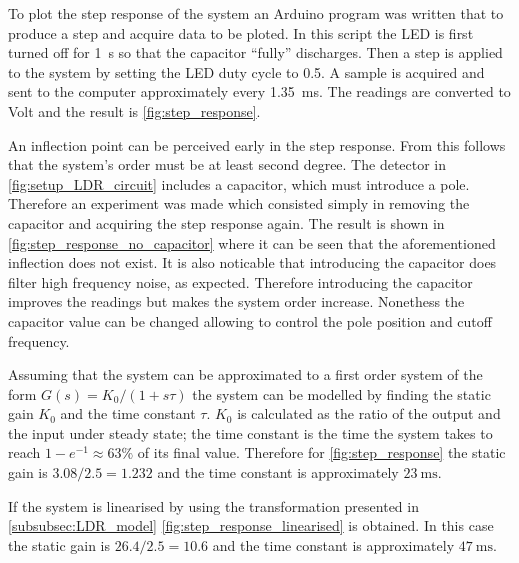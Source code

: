 To plot the step response of the system an Arduino program was written that to produce a step and acquire data to be ploted. In this script the LED is first turned off for \SI{1}{\second} so that the capacitor ``fully'' discharges. Then a step is applied to the system by setting the LED duty cycle to 0.5. A sample is acquired and sent to the computer approximately every \SI{1.35}{\milli\second}. The readings are converted to Volt and the result is \autoref{fig:step_response}.

An inflection point can be perceived early in the step response. From this follows that the system's order must be at least second degree. The detector in \autoref{fig:setup_LDR_circuit} includes a capacitor, which must introduce a pole. Therefore an experiment was made which consisted simply in removing the capacitor and acquiring the step response again. The result is shown in \autoref{fig:step_response_no_capacitor} where it can be seen that the aforementioned inflection does not exist. It is also noticable that introducing the capacitor does filter high frequency noise, as expected. Therefore introducing the capacitor improves the readings but makes the system order increase. Nonethess the capacitor value can be changed allowing to control the pole position and cutoff frequency.

Assuming that the system can be approximated to a first order system of the form $G(s) = K_0/(1+s\tau)$ the system can be modelled by finding the static gain $K_0$ and the time constant $\tau$. $K_0$ is calculated as the ratio of the output and the input under steady state; the time constant is the time the system takes to reach $1-e^{-1} \approx 63 \%$ of its final value. Therefore for \autoref{fig:step_response} the static gain is $3.08/2.5 = 1.232$ and the time constant is approximately $\SI{23}{\milli\second}$.

If the system is linearised by using the transformation presented in \ref{subsubsec:LDR_model} \autoref{fig:step_response_linearised} is obtained. In this case the static gain is $26.4/2.5 = 10.6$ and the time constant is approximately $\SI{47}{\milli\second}$.

